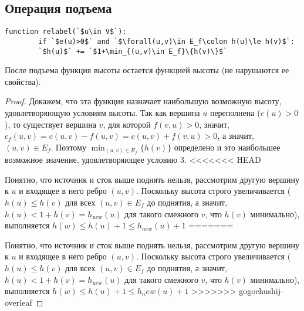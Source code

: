 \subsection{Операция подъема}
\begin{lstlisting}[escapeinside=``]
	function relabel(`$u\in V$`):
		if `$e(u)>0$` and `$\forall(u,v)\in E_f\colon h(u)\le h(v)$`:
		`$h(u)$` += `$1+\min_{(u,v)\in E_f}\{h(v)\}$`
\end{lstlisting}
\begin{lemma}
	После подъема функция высоты остается функцией высоты (не нарушаются ее свойства).
\end{lemma}
\begin{proof}
	Докажем, что эта функция назначает наибольшую возможную высоту, удовлетворяющую условиям высоты. Так как вершина $u$ переполнена ($e(u)>0$), то существует вершина $v$, для которой $f(v,u)>0$, значит, $c_f(u,v)=c(u,v)-f(u,v)=c(u,v)+f(v,u)>0$, а значит, $(u,v)\in E_f$. Поэтому $\min_{(u,v)\in E_f}\{h(v)\}$ определено и это наибольшее возможное значение, удовлетворяющее условию 3.
<<<<<<< HEAD
	
	Понятно, что источник и сток выше поднять нельзя, рассмотрим другую вершину к $u$ и входящее в него ребро $(u,v)$. Поскольку высота строго увеличивается ($h(u)\le h(v)$ для всех $(u,v)\in E_f$ до поднятия, а значит, $h(u)<1+h(v)=h_\mathrm{new}(u)$ для такого смежного $v$, что $h(v)$ минимально), выполняется $h(w)\le h(u)+1\le h_{new}(u)+1$
=======

	Понятно, что источник и сток выше поднять нельзя, рассмотрим другую вершину к $u$ и входящее в него ребро $(u,v)$. Поскольку высота строго увеличивается ($h(u)\le h(v)$ для всех $(u,v)\in E_f$ до поднятия, а значит, $h(u)<1+h(v)=h_\mathrm{new}(u)$ для такого смежного $v$, что $h(v)$ минимально), выполняется $h(w)\le h(u)+1\le h_new(u)+1$
>>>>>>> gogochushij-overleaf
\end{proof}

